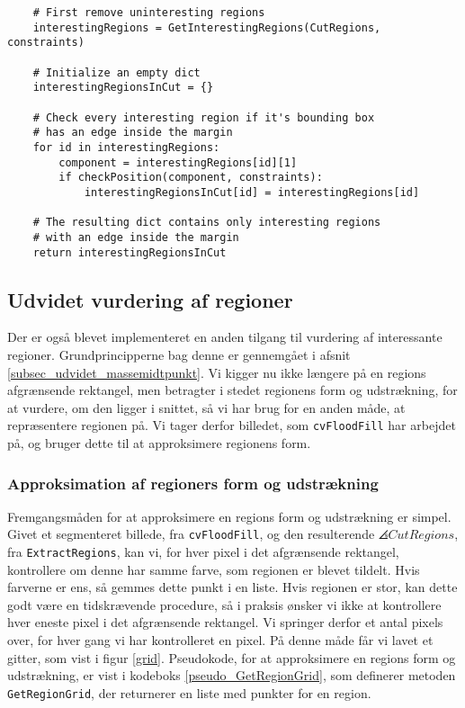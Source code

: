 {\begin{lstlisting}
    # First remove uninteresting regions
    interestingRegions = GetInterestingRegions(CutRegions, constraints)

    # Initialize an empty dict
    interestingRegionsInCut = {}

    # Check every interesting region if it's bounding box
    # has an edge inside the margin
    for id in interestingRegions:
        component = interestingRegions[id][1]
        if checkPosition(component, constraints):
            interestingRegionsInCut[id] = interestingRegions[id]

    # The resulting dict contains only interesting regions
    # with an edge inside the margin
    return interestingRegionsInCut
\end{lstlisting}

\subsection{Udvidet vurdering af regioner}
Der er også blevet implementeret en anden tilgang til vurdering af
interessante regioner. Grundprincipperne bag denne er gennemgået i
afsnit \ref{subsec_udvidet_massemidtpunkt}. Vi kigger nu ikke længere på
en regions afgrænsende rektangel, men betragter i stedet regionens form
og udstrækning, for at vurdere, om den ligger i snittet, så vi har brug
for en anden måde, at repræsentere regionen på. Vi tager derfor
billedet, som \texttt{cvFloodFill} har arbejdet på, og bruger dette til
at approksimere regionens form.

\subsubsection{Approksimation af regioners form og udstrækning}
Fremgangsmåden for at approksimere en regions form og udstrækning er
simpel. Givet et segmenteret billede, fra \texttt{cvFloodFill}, og den
resulterende $\angles{CutRegions}$, fra \texttt{ExtractRegions}, kan vi,
for hver pixel i det afgrænsende rektangel, kontrollere om denne har
samme farve, som regionen er blevet tildelt. Hvis farverne er ens, så
gemmes dette punkt i en liste. Hvis regionen er stor, kan dette godt
være en tidskrævende procedure, så i praksis ønsker vi ikke at
kontrollere hver eneste pixel i det afgrænsende rektangel. Vi springer
derfor et antal pixels over, for hver gang vi har kontrolleret en pixel.
På denne måde får vi lavet et gitter, som vist i figur \ref{grid}.
Pseudokode, for at approksimere en regions form og udstrækning, er vist
i kodeboks \ref{pseudo_GetRegionGrid}, som definerer metoden
\texttt{GetRegionGrid}, der returnerer en liste med punkter for en
region.

}
